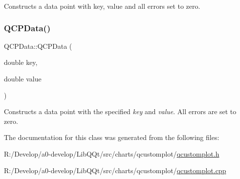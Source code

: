 Constructs a data point with key, value and all errors set to zero. \mbox{\label{class_q_c_p_data_aa274181ae8de2a0907ba5464d3c2c103}} 
\subsubsection{\texorpdfstring{Q\+C\+P\+Data()}{QCPData()}\hspace{0.1cm}{\footnotesize\ttfamily [2/2]}}
{\footnotesize\ttfamily Q\+C\+P\+Data\+::\+Q\+C\+P\+Data (\begin{DoxyParamCaption}\item[{double}]{key,  }\item[{double}]{value }\end{DoxyParamCaption})}

Constructs a data point with the specified {\itshape key} and {\itshape value}. All errors are set to zero. 

The documentation for this class was generated from the following files\+:\begin{DoxyCompactItemize}
\item 
R\+:/\+Develop/a0-\/develop/\+Lib\+Q\+Qt/src/charts/qcustomplot/\mbox{\hyperlink{qcustomplot_8h}{qcustomplot.\+h}}\item 
R\+:/\+Develop/a0-\/develop/\+Lib\+Q\+Qt/src/charts/qcustomplot/\mbox{\hyperlink{qcustomplot_8cpp}{qcustomplot.\+cpp}}\end{DoxyCompactItemize}
